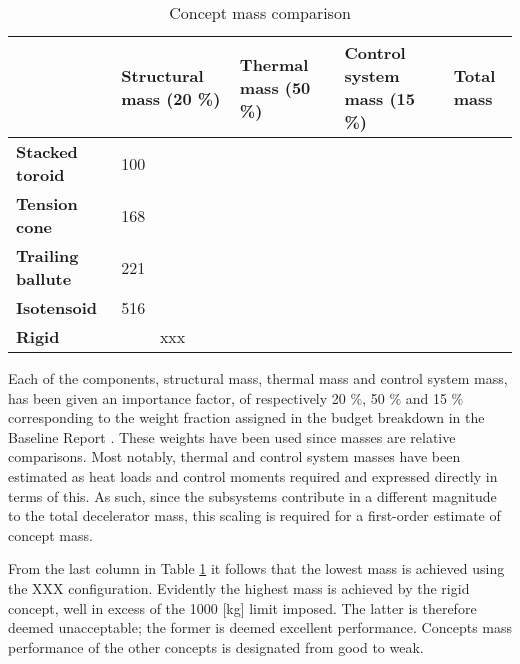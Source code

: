 \begin{table}[h]
\caption{Concept mass comparison}\label{tab:cmass}
\hspace{-10mm}
\begin{tabular}{|p{}|p{}|p{}|p{}||p{}|}
\hline
                          & \textbf{Structural mass (20 \%)} & \textbf{Thermal mass (50 \%)} & \textbf{Control system mass (15 \%)} & \textbf{Total mass} \\ \hline
\textbf{Stacked toroid}   &  100                                 &                          &                                       &\cellcolor{green!70}                            \\ \hline
\textbf{Tension cone}     &   168                               &                                &                                       &\cellcolor{green!70}                                \\ \hline
\textbf{Trailing ballute} &  221                                 &                                &                                       &\cellcolor{green!70}                                \\ \hline
\textbf{Isotensoid}       &  516                                 &                                &                                       &\cellcolor{yellow!75}                             \\ \hline
\textbf{Rigid}            &  \multicolumn{1}{c}{xxx}       &                                  &                                       &\cellcolor{red!60}                             \\ \hline
\end{tabular}
\end{table}

Each of the components, structural mass, thermal mass and control system mass, has been given an importance factor, of respectively 20 $\%$,  50 $\%$ and  15 $\%$ corresponding to the weight fraction assigned in the budget breakdown in the Baseline Report \cite[p.28]{Balasooriyan2015a}. These weights have been used since masses are relative comparisons. Most notably, thermal and control system masses have been estimated as heat loads and control moments required and expressed directly in terms of this. As such, since the subsystems contribute in a different magnitude to the total decelerator mass, this scaling is required for a first-order estimate of concept mass.

From the last column in Table \ref{tab:cmass} it follows that the lowest mass is achieved using the XXX configuration. Evidently the highest mass is achieved by the rigid concept, well in excess of the 1000 [kg] limit imposed. The latter is therefore deemed unacceptable; the former is deemed excellent performance. Concepts mass performance of the other concepts is designated from good to weak.

